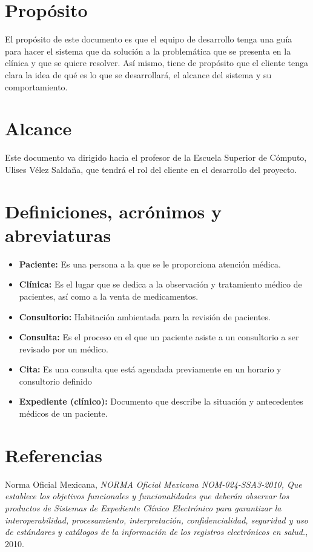 \section{Propósito}
El propósito de este documento es que el equipo de desarrollo tenga una guía para hacer el sistema que da solución a la problemática que se presenta en la clínica y que se quiere resolver. Así mismo,  tiene de propósito que el cliente tenga clara la idea de qué es lo que se desarrollará, el alcance del sistema y su comportamiento.

\section{Alcance}

Este documento va dirigido hacia el profesor de la Escuela Superior de  Cómputo,  Ulises Vélez Saldaña, que tendrá el rol del cliente en el desarrollo del proyecto.

\section{Definiciones, acrónimos y abreviaturas}

\begin{itemize}
\item \textbf{Paciente: }Es una persona a la que se le proporciona atención médica.
\item \textbf{Clínica: }Es el lugar que se dedica a la observación y tratamiento médico de pacientes, así como a la venta de medicamentos.
\item \textbf{Consultorio: }Habitación ambientada para la revisión de pacientes.
\item \textbf{Consulta: }Es el proceso en el que un paciente asiste a un consultorio a ser revisado por un médico.
\item \textbf{Cita: }Es una consulta que está agendada previamente en un horario y consultorio definido
\item \textbf{Expediente (clínico): }Documento que describe la situación y antecedentes médicos de un paciente.
\end{itemize}
\section{Referencias}
\begin{thebibliography}{9}

  Norma Oficial Mexicana,
  \emph{NORMA Oficial Mexicana NOM-024-SSA3-2010, Que establece los objetivos funcionales y funcionalidades que deberán observar los productos de Sistemas de Expediente Clínico Electrónico para garantizar la interoperabilidad, procesamiento, interpretación, confidencialidad, seguridad y uso de estándares y catálogos de la información de los registros electrónicos en salud.},
  2010.

\end{thebibliography}

